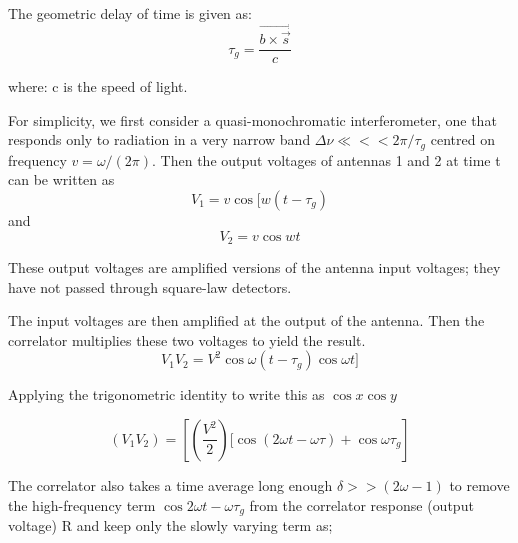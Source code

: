 {The geometric delay of time is given as:
\begin{equation}
 \tau_g = \frac{\vec{b \times\vec{s}}}{c}\label{eq:1}
\end{equation}

where: c is the speed of light.

For simplicity, we first consider a quasi-monochromatic interferometer, one that responds only to radiation in a very narrow band \(\Delta \nu \ll << 2\pi/\tau_g\) centred on frequency \(v=\omega /(2\pi)\). Then the output voltages of antennas 1 and 2 at time t can be written as
\begin{equation}
V_1 =v\cos{[w(t-\tau_g)}\label{eq:2} 
\end{equation}
    and 
\begin{equation}
V_2 = v\cos{wt}\label{eq:3}
\end{equation}



These output voltages are amplified versions of the antenna input voltages; they have not passed through square-law detectors.

The input voltages are then amplified at the output of the antenna. Then the  correlator multiplies these two voltages to yield the result.
\begin{equation}
 V_1V_2=V^{2}\cos{\omega(t-\tau_ g)}\cos{\omega t}] \label{eq:4}
 \end{equation}
 
Applying  the trigonometric identity to write this as  \(\cos{x}\cos{y}\)
 
 \begin{equation}
(V_1V_2)=\left[\left(\frac{V^{2}}{2}\right) [\cos{(2\omega t - \omega\tau) + \cos{\omega\tau_g}}\right]\label{eq:5}
\end{equation}


The correlator also takes a time average long enough \(\delta >> (2\omega -1)\) to remove the high-frequency term \( \cos{2} \omega t - \omega \tau_g\) from the correlator response (output voltage) R and keep only the slowly varying term as;

}
